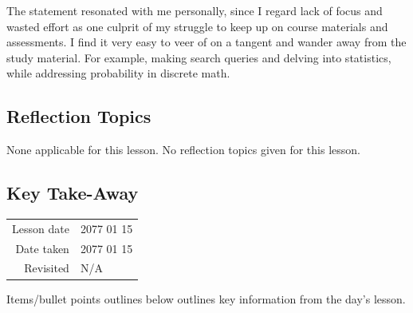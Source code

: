{The statement resonated with me personally, since I regard lack of focus and wasted effort as one culprit of my struggle to keep up on course materials and assessments. I find it very easy to veer of on a tangent and wander away from the study material. For example, making search queries and delving into statistics, while addressing probability in discrete math.




\subsection{Reflection Topics}

None applicable for this lesson. No reflection topics given for this lesson.




\subsection{Key Take-Away}

\begin{table}[H]
    \begin{tabular}{r @{: } p{40mm}}
        Lesson date & 2077 01 15 \\
        Date taken & 2077 01 15 \\
        Revisited & N/A \\
    \end{tabular}
\end{table}

Items/bullet points outlines  below outlines key information from the day's lesson.

}
